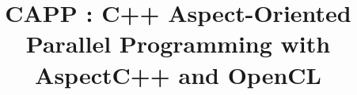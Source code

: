 \documentclass{sig-alternate-05-2015}
\begin{document}






%

\title{CAPP : C++ Aspect-Oriented Parallel Programming with AspectC++ and OpenCL}
%
%
%
%
%
\end{document}
